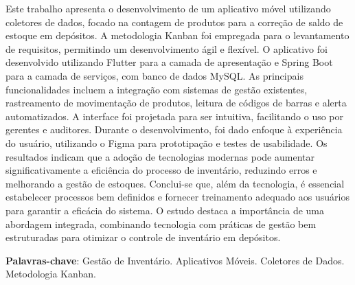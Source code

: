 Este trabalho apresenta o desenvolvimento de um aplicativo móvel utilizando coletores de dados, focado na contagem de produtos para a correção de saldo de estoque em depósitos. A metodologia Kanban foi empregada para o levantamento de requisitos, permitindo um desenvolvimento ágil e flexível. O aplicativo foi desenvolvido utilizando Flutter para a camada de apresentação e Spring Boot para a camada de serviços, com banco de dados MySQL. As principais funcionalidades incluem a integração com sistemas de gestão existentes, rastreamento de movimentação de produtos, leitura de códigos de barras e alerta automatizados. A interface foi projetada para ser intuitiva, facilitando o uso por gerentes e auditores. Durante o desenvolvimento, foi dado enfoque à experiência do usuário, utilizando o Figma para prototipação e testes de usabilidade. Os resultados indicam que a adoção de tecnologias modernas pode aumentar significativamente a eficiência do processo de inventário, reduzindo erros e melhorando a gestão de estoques. Conclui-se que, além da tecnologia, é essencial estabelecer processos bem definidos e fornecer treinamento adequado aos usuários para garantir a eficácia do sistema. O estudo destaca a importância de uma abordagem integrada, combinando tecnologia com práticas de gestão bem estruturadas para otimizar o controle de inventário em depósitos.

\textbf{Palavras-chave}: Gestão de Inventário. Aplicativos Móveis. Coletores de Dados. Metodologia Kanban.
